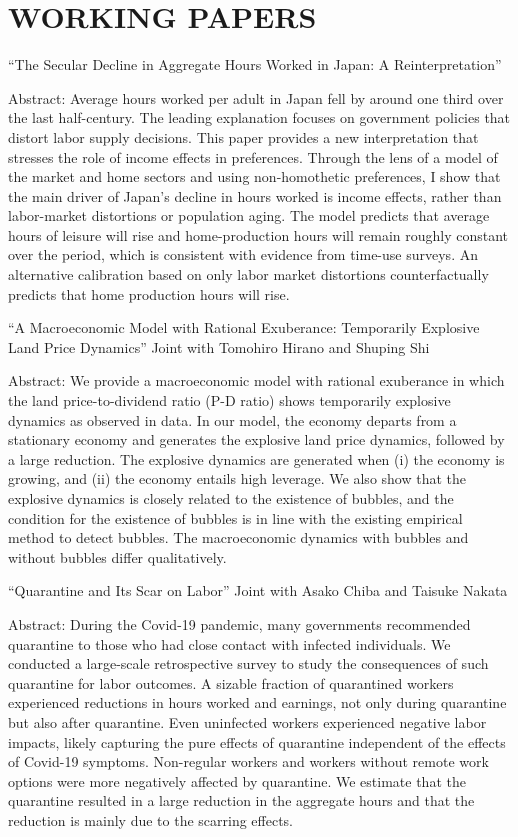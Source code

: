 \documentclass[12pt]{article}
\begin{document}
\section*{WORKING PAPERS}
``The Secular Decline in Aggregate Hours Worked in Japan: A Reinterpretation''
\begin{adjustwidth}{1em}{1em}
Abstract: Average hours worked per adult in Japan fell by around one third over the last half-century. The leading explanation focuses on government policies that distort labor supply decisions. This paper provides a new interpretation that stresses the role of income effects in preferences. Through the lens of a model of the market and home sectors and using non-homothetic preferences, I show that the main driver of Japan's decline in hours worked is income effects, rather than labor-market distortions or population aging. The model predicts that average hours of leisure will rise and home-production hours will remain roughly constant over the period, which is consistent with evidence from time-use surveys. An alternative calibration based on only labor market distortions counterfactually predicts that home production hours will rise.
\end{adjustwidth}
\vspace{1em}
``A Macroeconomic Model with Rational Exuberance: Temporarily Explosive Land Price Dynamics'' Joint with Tomohiro Hirano and Shuping Shi
\begin{adjustwidth}{1em}{1em}
  Abstract: We provide a macroeconomic model with rational exuberance in which the land price-to-dividend ratio (P-D ratio) shows temporarily explosive dynamics as observed in data. In our model, the economy departs from a stationary economy and generates the explosive land price dynamics, followed by a large reduction. The explosive dynamics are generated when (i) the economy is growing, and (ii) the economy entails high leverage. We also show that the explosive dynamics is closely related to the existence of bubbles, and the condition for the existence of bubbles is in line with the existing empirical method to detect bubbles. The macroeconomic dynamics with bubbles and without bubbles differ qualitatively. 
\end{adjustwidth}
\vspace{1em}
``Quarantine and Its Scar on Labor'' Joint with Asako Chiba and Taisuke Nakata
\begin{adjustwidth}{1em}{1em}
Abstract: During the Covid-19 pandemic, many governments recommended quarantine to those who had close contact with infected individuals. We conducted a large-scale retrospective survey to study the consequences of such quarantine for labor outcomes. A sizable fraction of quarantined workers experienced reductions in hours worked and earnings, not only during quarantine but also after quarantine. Even uninfected workers experienced negative labor impacts, likely capturing the pure effects of quarantine independent of the effects of Covid-19 symptoms. Non-regular workers and workers without remote work options were more negatively affected by quarantine. We estimate that the quarantine resulted in a large reduction in the aggregate hours and that the reduction is mainly due to the scarring effects.
\end{adjustwidth}
\end{document}
